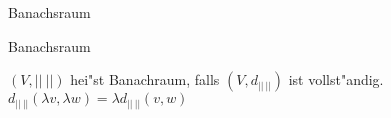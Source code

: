 \documentclass[class=article, crop=false]{standalone}
\begin{document}
\begin{zettel}{Banachsraum}
\begin{flashcard}[ut40njya]{Banachsraum}
	\begin{definition}[Banachsraum]
		$ (V, ||\ ||)  $ hei"st Banachraum, falls $ (V,d_{||\ ||})  $ ist vollst"andig.
		$d_{ ||\ ||}(\lambda v, \lambda w) = \lambda  d_{ ||\ ||} (v,w) $
	\end{definition}
\end{flashcard}
\end{zettel}
\end{document}

